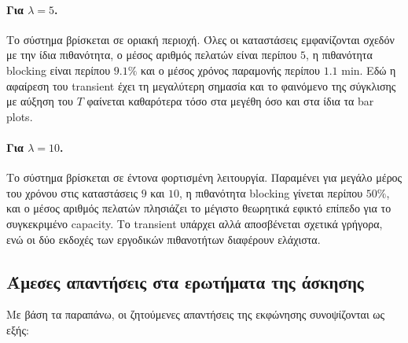 \documentclass{article}
\begin{document}
\paragraph{Για $\lambda=5$.}
Το σύστημα βρίσκεται σε οριακή περιοχή. Όλες οι καταστάσεις εμφανίζονται σχεδόν με την ίδια πιθανότητα, ο μέσος αριθμός πελατών είναι περίπου $5$, η πιθανότητα blocking είναι περίπου $9.1\%$ και ο μέσος χρόνος παραμονής περίπου $1.1$ min. Εδώ η αφαίρεση του transient έχει τη μεγαλύτερη σημασία και το φαινόμενο της σύγκλισης με αύξηση του $T$ φαίνεται καθαρότερα τόσο στα μεγέθη όσο και στα ίδια τα bar plots.

\paragraph{Για $\lambda=10$.}
Το σύστημα βρίσκεται σε έντονα φορτισμένη λειτουργία. Παραμένει για μεγάλο μέρος του χρόνου στις καταστάσεις $9$ και $10$, η πιθανότητα blocking γίνεται περίπου $50\%$, και ο μέσος αριθμός πελατών πλησιάζει το μέγιστο θεωρητικά εφικτό επίπεδο για το συγκεκριμένο capacity. Το transient υπάρχει αλλά αποσβένεται σχετικά γρήγορα, ενώ οι δύο εκδοχές των εργοδικών πιθανοτήτων διαφέρουν ελάχιστα.

\subsection{Άμεσες απαντήσεις στα ερωτήματα της άσκησης}

Με βάση τα παραπάνω, οι ζητούμενες απαντήσεις της εκφώνησης συνοψίζονται ως εξής:
\end{document}
